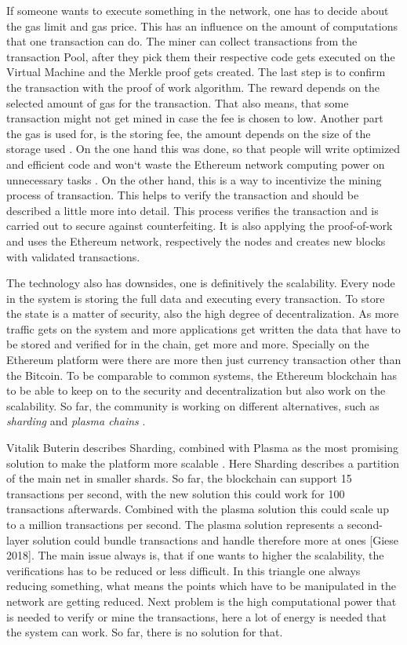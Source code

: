 If someone wants to execute something in the network, one has to decide about the gas limit and gas price. 
This has an influence on the amount of computations that one transaction can do.
The miner can collect transactions from the transaction Pool, after they pick them their respective code gets executed on the Virtual Machine and the Merkle proof gets created. 
The last step is to confirm the transaction with the proof of work algorithm. 
The reward depends on the selected amount of gas for the transaction. 
That also means, that some transaction might not get mined in case the fee is chosen to low. Another part the gas is used for, is the storing fee, the amount depends on the size of the storage used \cite{preethi}.
On the one hand this was done, so that people will write optimized and efficient code and won`t waste the Ethereum network computing power on unnecessary tasks \cite{preethi, Dannen2017IES3103305}.
On the other hand, this is a way to incentivize the mining process of transaction. 
This helps to verify the transaction and should be described a little more into detail. 
This process verifies the transaction and is carried out to secure against counterfeiting. 
It is also applying the proof-of-work and uses the Ethereum network, respectively the nodes and creates new blocks with validated transactions. 

The technology also has downsides, one is definitively the scalability. 
Every node in the system is storing the full data and executing every transaction. 
To store the state is a matter of security, also the high degree of decentralization. 
As more traffic gets on the system and more applications get written the data that have to be stored and verified for in the chain, get more and more. 
Specially on the Ethereum platform were there are more then just currency transaction other than the Bitcoin. 
To be comparable to common systems, the Ethereum blockchain has to be able to keep on to the security and decentralization but also work on the scalability. 
So far, the community is working on different alternatives, such as \emph{sharding} and \emph{plasma chains} \cite{Gadaleta2018}.

Vitalik Buterin describes Sharding, combined with Plasma as the most promising solution to make the platform more scalable \cite{Giese2018}.
Here Sharding describes a partition of the main net in smaller shards. 
So far, the blockchain can support 15 transactions per second, with the new solution this could work for 100 transactions afterwards. 
Combined with the plasma solution this could scale up to a million transactions per second. 
The plasma solution represents a second-layer solution could bundle transactions and handle therefore more at ones [Giese 2018].
The main issue always is, that if one wants to higher the scalability, the verifications has to be reduced or less difficult. 
In this triangle one always reducing something, what means the points which have to be manipulated in the network are getting reduced.
Next problem is the high computational power that is needed to verify or mine the transactions, here a lot of energy is needed that the system can work. So far, there is no solution for that.

